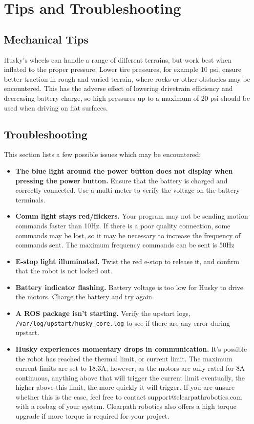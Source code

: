 \documentclass[]{clearpath-latex/clearpath-manual}
\begin{document}
\section{Tips and Troubleshooting}

\subsection{Mechanical Tips}
Husky’s wheels can handle a range of different terrains, but work best when inflated to the proper pressure.
Lower tire pressures, for example 10 psi, ensure better traction in rough and varied terrain, where rocks or
other obstacles may be encountered. This has the adverse effect of lowering drivetrain efficiency and decreasing
battery charge, so high pressures up to a maximum of 20 psi should be used when driving on flat surfaces.

\subsection{Troubleshooting}

This section lists a few possible issues which may be encountered:

\begin{itemize}
	\item \textbf{The blue light around the power button does not display when pressing the power button.} Ensure that the battery is charged and correctly connected. Use a multi-meter to verify the voltage on the battery terminals.
	\item \textbf{Comm light stays red/flickers.} Your program may not be sending motion commands faster than 10Hz. If there is a poor quality connection, some commands may be lost, so it may be necessary to increase the frequency of commands sent. The maximum frequency commands can be sent is 50Hz
	\item \textbf{E-stop light illuminated.} Twist the red e-stop to release it, and confirm that the robot is not locked out.
	\item \textbf{Battery indicator flashing.} Battery voltage is too low for Husky to drive the motors. Charge the battery and try again.
	\item \textbf{A ROS package isn't starting.} Verify the upstart logs, \lstinline{/var/log/upstart/husky_core.log} to see if there are any error during upstart.
	\item \textbf{Husky experiences momentary drops in communication.} It's possible the robot has reached the thermal limit, or current limit. The maximum current limits are set to 18.3A, however, as  the motors are only rated for 8A continuous, anything above that will trigger the current limit eventually, the higher above this limit, the more quickly it will trigger.  If you are unsure whether this is the case, feel free to contact support@clearpathrobotics.com with a rosbag of your system. Clearpath robotics also offers a high torque upgrade if more torque is required for your project.
\end{itemize}
\end{document}

